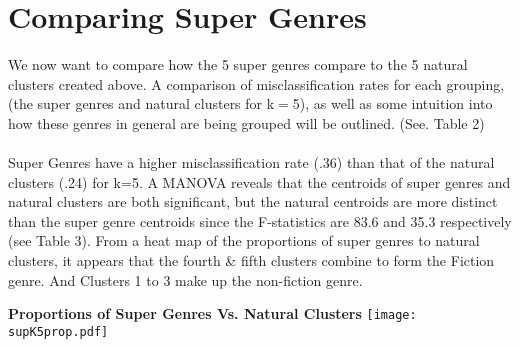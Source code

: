 \documentclass[11pt]{article}
\begin{document}
\section*{Comparing Super Genres}
We now want to compare how the 5 super genres compare to the 5 natural clusters created above. A comparison of misclassification rates for each grouping, (the super genres and natural clusters for k$=$5), as well as some intuition into how these genres in general are being grouped will be outlined. (See. Table 2)
\\
\\
Super Genres have a higher misclassification rate (.36) than that of the natural clusters (.24) for k=5. A MANOVA reveals that the centroids of super genres and natural clusters are both significant, but the natural centroids are more distinct than the super genre centroids since the F-statistics are 83.6 and 35.3 respectively (see Table 3). From a heat map of the proportions of super genres to natural clusters, it appears that the fourth \& fifth clusters combine to form the Fiction genre. And Clusters 1 to 3 make up the non-fiction genre.




\begin{center}
  \textbf{Proportions of Super Genres Vs. Natural Clusters}
  \texttt{[image: supK5prop.pdf]}
\end{center}


\end{document}
